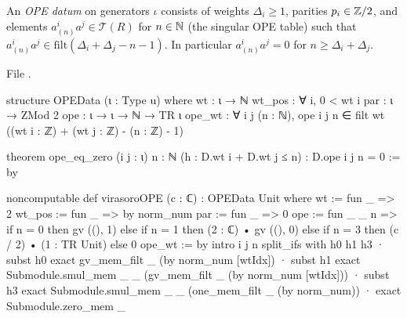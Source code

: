 \begin{definition}\label{l11:def:opedata}
An \emph{OPE datum} on generators $\iota$ consists of weights $\Delta_i\ge1$, parities $p_i\in{\mathbb{Z}}/2$, and elements
$a^i_{(n)}a^j\in\mathcal T(R)$ for $n\in{\mathbb{N}}$ (the singular OPE table) such that
$a^i_{(n)}a^j\in\mathrm{filt}(\Delta_i+\Delta_j-n-1)$. In particular $a^i_{(n)}a^j = 0$ for $n\ge\Delta_i+\Delta_j$.
\end{definition}
\noindent File .
\begin{leancode}
structure OPEData (ι : Type u) where
  wt : ι → ℕ
  wt_pos : ∀ i, 0 < wt i
  par : ι → ZMod 2
  ope : ι → ι → ℕ → TR ι
  ope_wt : ∀ i j (n : ℕ), ope i j n ∈ filt wt ((wt i : ℤ) + (wt j : ℤ) - (n : ℤ) - 1)

theorem ope_eq_zero (i j : ι) {n : ℕ} (h : D.wt i + D.wt j ≤ n) : D.ope i j n = 0 := by

noncomputable def virasoroOPE (c : ℂ) : OPEData Unit where
  wt := fun _ => 2
  wt_pos := fun _ => by norm_num
  par := fun _ => 0
  ope := fun _ _ n =>
    if n = 0 then gv ((), 1)
    else if n = 1 then (2 : ℂ) • gv ((), 0)
    else if n = 3 then (c / 2) • (1 : TR Unit)
    else 0
  ope_wt := by
    intro i j n
    split_ifs with h0 h1 h3
    · subst h0
      exact gv_mem_filt _ (by norm_num [wtIdx])
    · subst h1
      exact Submodule.smul_mem _ _ (gv_mem_filt _ (by norm_num [wtIdx]))
    · subst h3
      exact Submodule.smul_mem _ _ (one_mem_filt _ (by norm_num))
    · exact Submodule.zero_mem _
\end{leancode}

